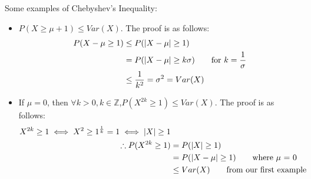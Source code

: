 Some examples of Chebyshev's Inequality:
\begin{itemize}
    \item $P(X \geq \mu + 1) \leq Var(X)$. The proof is as follows: 
    \begin{equation*}
    \begin{split}
        P(X - \mu \geq 1) & \leq P(|X - \mu| \geq 1) \\
        & = P(|X - \mu| \geq k\sigma) \text{\qquad for $k = \dfrac{1}{\sigma}$} \\
        & \leq \dfrac{1}{k^2} = \sigma^2 = Var(X)
    \end{split}
    \end{equation*}
    
    \item If $\mu = 0$, then $\forall k > 0, k \in \mathbb{Z}$,\quad  $P(X^{2k} \geq 1) \leq Var(X)$. The proof is as follows:
    \begin{equation*}
    \begin{split}
    X^{2k} \geq 1 \iff X^2 \geq 1^{\frac{1}{k}} = 1 \iff |X| \geq 1 \\
    \therefore P(X^{2k} \geq 1) &= P(|X| \geq 1) \\
    &= P(|X - \mu| \geq 1) \text{\qquad where $\mu$ = 0} \\
    & \leq Var(X) \text{\qquad from our first example}
    \end{split}
    \end{equation*}
\end{itemize}
